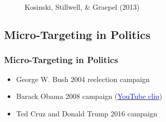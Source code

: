 \documentclass[aspectratio=169]{beamer}
\begin{document}
\begin{frame}
{\begin{figure}
            \caption{Kosinski, Stillwell, \& Graepel (2013)}
        \end{figure}
    }

\end{frame}

\subsection[Politics]{Micro-Targeting in Politics}

\begin{frame}
    \frametitle{Micro-Targeting in Politics}
    \begin{itemize}
        \item George W. Bush 2004 reelection campaign
        \item Barack Obama 2008 campaign (\href{https://www.youtube.com/watch?time_continue=7&v=BiQwcFRUg_8}{\textcolor{blue}{YouTube clip}})
        \item Ted Cruz and Donald Trump 2016 campaign
    \end{itemize}
\end{frame}
\end{document}
